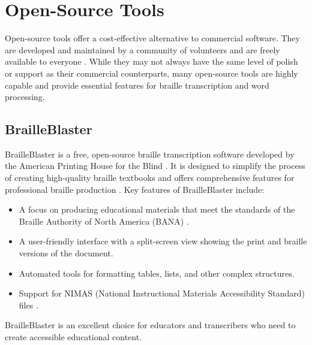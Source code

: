\section{Open-Source Tools}\label{ch12:sec:open-source-tools}
Open-source tools offer a cost-effective alternative to commercial software. They are developed and maintained by a community of volunteers and are freely available to everyone \supercite{Stallman2002}. While they may not always have the same level of polish or support as their commercial counterparts, many open-source tools are highly capable and provide essential features for braille transcription and word processing.

\subsection{BrailleBlaster}\label{ch12:ssec:brailleblaster}
BrailleBlaster is a free, open-source braille transcription software developed by the American Printing House for the Blind \supercite{BrailleBlaster, APHBrailleBlaster, BrailleBlasterOrg}. It is designed to simplify the process of creating high-quality braille textbooks and offers comprehensive features for professional braille production \supercite{APHBrailleBlasterFeatures}. Key features of BrailleBlaster include:
\begin{itemize}
	\item A focus on producing educational materials that meet the standards of the Braille Authority of North America (BANA) \supercite{BANA}.
	\item A user-friendly interface with a split-screen view showing the print and braille versions of the document.
	\item Automated tools for formatting tables, lists, and other complex structures.
	\item Support for NIMAS (National Instructional Materials Accessibility Standard) files \supercite{NIMAC2025}.
\end{itemize}
BrailleBlaster is an excellent choice for educators and transcribers who need to create accessible educational content.

